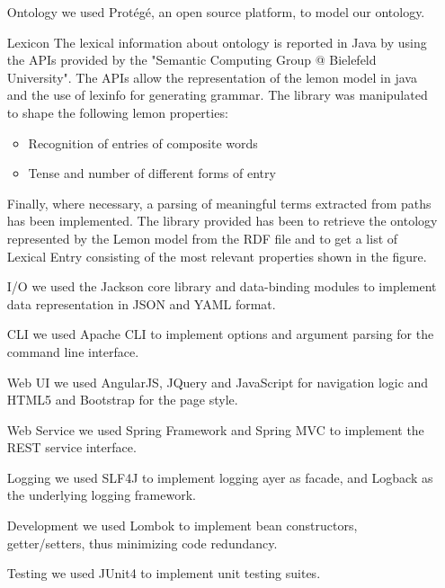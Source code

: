 \begin{itemize}
	\item[Ontology] we used Protégé, an open source platform, to model our ontology.
	
	\item[Lexicon] The lexical information about ontology is reported in Java by using the APIs provided by the "Semantic Computing Group @ Bielefeld University". The APIs allow the representation of the lemon model in java and the use of lexinfo for generating grammar. The library was manipulated to shape the following lemon properties: 
	\begin{itemize}
		\item Recognition of entries of composite words
		\item Tense and number of different forms of entry 
	\end{itemize}	

Finally, where necessary, a parsing of meaningful terms extracted from paths has been implemented.
%
The library provided has been to retrieve the ontology represented by the Lemon model from the RDF file and to get a list of Lexical Entry consisting of the most relevant properties shown in the figure.

	\item[I/O] we used the Jackson core library and data-binding modules to implement data representation in JSON and YAML format.
	
	\item[CLI] we used Apache CLI to implement options and argument parsing for the command line interface.
	
	\item[Web UI] we used AngularJS, JQuery and JavaScript for navigation logic and HTML5 and Bootstrap for the page style.
	
	\item[Web Service] we used Spring Framework and Spring MVC to implement the REST service interface.
	
	\item[Logging] we used SLF4J to implement logging ayer as facade, and Logback as the underlying logging framework.
	
	\item[Development] we used Lombok to implement bean constructors, getter/setters, thus minimizing code redundancy.
	
	\item[Testing] we used JUnit4 to implement unit testing suites.
\end{itemize}

